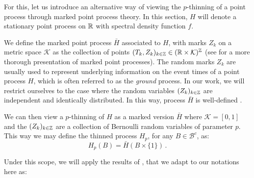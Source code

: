 For this, let us introduce an alternative way of viewing the $p$-thinning of a point process through marked point process theory.
In this section, $H$ will denote a stationary point process on ${\mathbb R}$ with spectral density function $f$.

We define the marked point process $\bar H$ associated to $H$, with marks $Z_k$ on a metric space $\mathcal{K}$ as the collection of points
$(T_k, Z_k)_{k\in{\mathbb Z}} \in ({\mathbb R} \times \mathcal{K})^{{\mathbb Z}}$ (see \textcite[Chapter 6.4]{DaleyV1} for a more thorough presentation of marked point processes). 
The random marks $Z_k$ are usually used to represent underlying information on the event times of a point process $H$, 
which is often referred to as the \textit{ground} process.
In our work, we will restrict ourselves to the case where the random variables $(Z_k)_{k\in{\mathbb Z}}$ are independent and identically distributed.
In this way, process $\bar H$ is well-defined \parencite[6.4.IV(a)]{DaleyV1}.

We can then view a $p$-thinning of $H$ as a marked version $\bar H$ where $\mathcal{K} = [0,1]$
and the $(Z_k)_{k\in{\mathbb Z}}$ are a collection of Bernoulli random variables of parameter $p$.
This way we may define the thinned process $H_p$, for any $B\in\mathcal{B}^c$, as:
\[H_p(B) = \bar H(B\times\{1\})\,.\]

Under this scope, we will apply the results of \textcite{Bremaud2005}, 
that we adapt to our notations here as:

